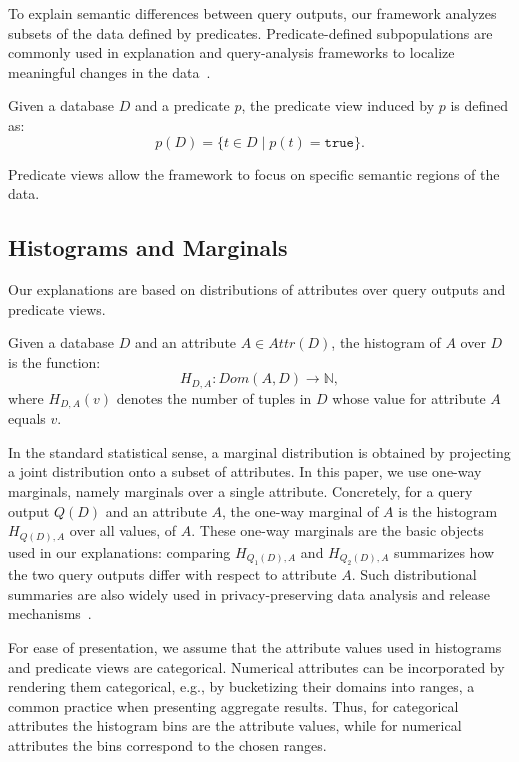 To explain semantic differences between query outputs, our framework analyzes subsets
of the data defined by predicates. Predicate-defined subpopulations are commonly used
in explanation and query-analysis frameworks to localize meaningful changes in the
data~\cite{FEDEX,dpxplain2022,wu2013}.

\begin{definition}
Given a database $D$ and a predicate $p$, the predicate view induced by $p$ is defined as:
\[
p(D)=\{t\in D \mid p(t)=\texttt{true}\}.
\]
\end{definition}

Predicate views allow the framework to focus on specific semantic regions of the data.

\subsection{Histograms and Marginals}
\label{subsec:prelim-histograms}

Our explanations are based on distributions of attributes over query outputs and predicate views.

\begin{definition}[Histogram]
Given a database $D$ and an attribute $A \in Attr(D)$, the histogram of $A$ over $D$
is the function:
\[
H_{D,A}: Dom(A,D)\rightarrow \mathbb{N},
\]
where $H_{D,A}(v)$ denotes the number of tuples in $D$ whose value for attribute $A$
equals $v$.
\end{definition}

In the standard statistical sense, a marginal distribution is obtained by
projecting a joint distribution onto a subset of attributes. In this
paper, we use one-way marginals, namely marginals over a single
attribute. Concretely, for a query output $Q(D)$ and an attribute $A$,
the one-way marginal of $A$ is the histogram $H_{Q(D),A}$ over all
values, of $A$. These one-way marginals are the basic
objects used in our explanations: comparing $H_{Q_1(D),A}$ and
$H_{Q_2(D),A}$ summarizes how the two query outputs differ with respect to attribute $A$. Such distributional
summaries are also widely used in privacy-preserving data analysis and release
mechanisms~\cite{dwork2014}.

For ease of presentation, we assume that the attribute values used in
histograms and predicate views are categorical. Numerical attributes can
be incorporated by rendering them categorical, e.g., by bucketizing their
domains into ranges, a common practice when presenting aggregate
results. Thus, for categorical attributes the histogram bins are the
attribute values, while for numerical attributes the bins correspond to
the chosen ranges.

